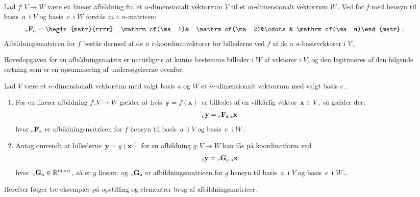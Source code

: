 \begin{definition}[Afbildningsmatrix]\label{tn8.DefAfbMatrix}
Lad $f:V\rightarrow W$ være en lineær afbildning fra et $n$-dimensionalt vektorrum $ V $ til et $m$-dimensionalt vektorrum $W\,$. Ved  for $f$ med hensyn til basis $\,a\,$ i $V$ og basis $\,c\,$ i $W$ forstås $m\times n$-matricen:
\begin{equation}
\matind cFa = \begin{matr}{rrrr}
_\mathrm cf(\ma_1)& _\mathrm cf(\ma_2)&\cdots&_\mathrm cf(\ma_n)\end{matr}\,.
\end{equation}
Afbildningsmatricen for $f$ består dermed af de $n$ $c$-koordinatvektorer for billederne ved $f$ af de $n$ $a$-basisvektorer i $V\,$.
\end{definition}

Hovedopgaven for en afbildningsmatrix er naturligvis at kunne bestemme billeder i $W$ af vektorer i $V$, og den legitimeres af den følgende sætning som er en opsummering af undersøgelserne ovenfor.

\begin{theorem}\label{tn8.ThAfbMatrix}
Lad $ V $ være et $n$-dimensionalt vektorrum med valgt basis $a$ og $ W $ et $m$-dimensionalt vektorrum med valgt basis $c\,.$ 
\begin{enumerate}
\item 
For en lineær afbildning $f:V\rightarrow W$ gælder at hvis $\,\mathbf y=f(\mathbf x)\,$ er billedet af en vilkårlig vektor $\,\mathbf x \in V\,,$ så gælder der:
\begin{equation}
{_\mathrm{c}\mathbf{y}}={_\mathrm{c}\mathbf{F}_\mathrm{a}}\,{_\mathrm{a}\mathbf{x}}\, 
\end{equation}
hvor ${_\mathrm{c}\mathbf{F}_\mathrm{a}}$ er afbildningsmatricen for $f$ hensyn til basis $\,a\,$ i $V$ og basis $\,c\,$ i $W\,.$
\item
Antag omvendt at billederne $\,\mathbf y=g(\mathbf x)\,$ for en afbildning $g:V\rightarrow W$ kan fås på koordinatform ved
\begin{equation}
{_\mathrm{c}\mathbf{y}}={_\mathrm{c}\mathbf{G}_\mathrm{a}}\,{_\mathrm{a}\mathbf{x}}\,
\end{equation}
hvor $\,{_\mathrm{c}\mathbf{G}_\mathrm{a}} \in \mathbb{R}^{m\times n}\,,$ så er $g$ lineær, og ${_\mathrm{c}\mathbf{G}_\mathrm{a}}$ er afbildningsmatricen for $g$ hensyn til basis $\,a\,$ i $V$ og basis $\,c\,$ i $W\,.$.
\end{enumerate}
\end{theorem}

Herefter følger tre eksempler på opstilling og elementær brug af afbildningsmatricer. 


